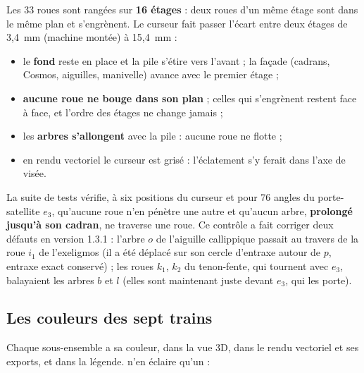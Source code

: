 
Les 33 roues sont rangées sur \textbf{16 étages} : deux roues d'un même étage sont dans le même
plan et s'engrènent. Le curseur  fait passer l'écart entre deux
étages de 3,4~mm (machine montée) à 15,4~mm :
\begin{itemize}
  \item le \textbf{fond} reste en place et la pile s'étire vers l'avant ; la façade (cadrans,
        Cosmos, aiguilles, manivelle) avance avec le premier étage ;
  \item \textbf{aucune roue ne bouge dans son plan} ; celles qui s'engrènent restent face à
        face, et l'ordre des étages ne change jamais ;
  \item les \textbf{arbres s'allongent} avec la pile : aucune roue ne flotte ;
  \item en rendu vectoriel le curseur est grisé : l'éclatement s'y ferait dans l'axe de visée.
\end{itemize}

\begin{info}
La suite de tests vérifie, à six positions du curseur et pour 76 angles du porte-satellite
$e_3$, qu'aucune roue n'en pénètre une autre et qu'aucun arbre, \textbf{prolongé jusqu'à son
cadran}, ne traverse une roue. Ce contrôle a fait corriger deux défauts en version 1.3.1 :
l'arbre $o$ de l'aiguille callippique passait au travers de la roue $i_1$ de l'exeligmos (il a
été déplacé sur son cercle d'entraxe autour de $p$, entraxe exact conservé) ; les roues $k_1$,
$k_2$ du tenon-fente, qui tournent avec $e_3$, balayaient les arbres $b$ et $l$ (elles sont
maintenant juste devant $e_3$, qui les porte).
\end{info}


\subsection{Les couleurs des sept trains}

Chaque sous-ensemble a sa couleur, dans la vue 3D, dans le rendu vectoriel et ses exports, et
dans la légende.  n'en éclaire qu'un :

